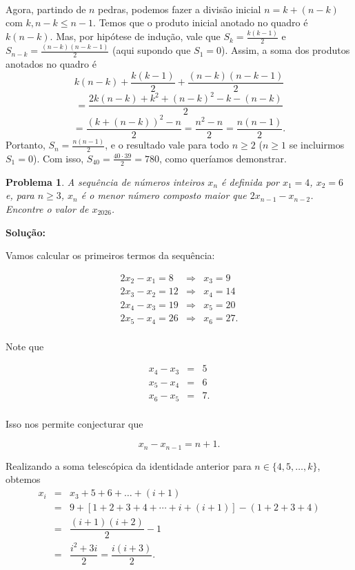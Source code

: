 \documentclass{hipatia}
\newtheorem{problem*}{Problema}
\begin{document}
\ 

Agora, partindo de $n$ pedras, podemos fazer a divisão inicial $n = k + (n - k)$ com $k, n - k \leq n - 1$. Temos que o produto inicial anotado no quadro é $k(n - k)$. Mas, por hipótese de indução, vale que $S_k = \frac{k(k-1)}{2}$ e $S_{n-k} = \frac{(n-k)(n-k-1)}{2}$ (aqui supondo que $S_1 = 0$). Assim, a soma dos produtos anotados no quadro é 
$$k(n - k) + \frac{k(k-1)}{2} + \frac{(n-k)(n-k-1)}{2} $$
$$= \frac{2k(n-k) + k^2 + (n-k)^2 - k - (n-k)}{2}$$ 
$$= \frac{(k + (n-k))^2 - n}{2} = \frac{n^2 - n}{2} = \frac{n(n-1)}{2}.$$ Portanto, $S_n = \frac{n(n-1)}{2}$, e o resultado vale para todo $n \geq 2$ ($n \geq 1$ se incluirmos $S_1 = 0$). Com isso, $S_{40} = \frac{40 \cdot 39}{2} = 780$, como queríamos demonstrar.







\begin{problem*}
A sequência de números inteiros $x_n$ é definida por $x_1 = 4$, $x_2 = 6$ e, para $n \geq 3$, $x_n$ é o menor número composto maior que $2x_{n-1} - x_{n-2}$. Encontre o valor de $x_{2026}$.
\end{problem*}

\noindent \textbf{Solução:}

\noindent Vamos calcular os primeiros termos da sequência:

\begin{eqnarray*}
2x_{2} - x_1 = 8 & \Rightarrow & x_3 = 9 \\
2x_{3} - x_2 = 12 & \Rightarrow & x_4 = 14 \\
2x_{4} - x_3 = 19 & \Rightarrow & x_5 = 20 \\
2x_{5} - x_4 = 26 & \Rightarrow & x_6 = 27 .\\
\end{eqnarray*}

\noindent Note que 

\begin{eqnarray*}
x_4 - x_3 & = & 5 \\
x_5 - x_4 & = & 6 \\
x_6 - x_5 & = & 7 .\\
\end{eqnarray*}

\noindent Isso nos permite conjecturar que 

$$x_{n} - x_{n-1} = n + 1.$$

\noindent Realizando a soma telescópica da identidade anterior para $n \in \{4,5, \ldots, k\}$, obtemos 
\begin{eqnarray*}
x_i & = & x_3+ 5+6+\ldots+(i+1) \\
    & = & 9 + [1 + 2 + 3 + 4 + \cdots + i + (i+1)] - (1 + 2 + 3 + 4)\\
    & = & \dfrac{(i+1)(i+2)}{2} - 1 \\
	& = & \dfrac{i^2 + 3i}{2} = \dfrac{i(i+3)}{2}. 
\end{eqnarray*}
\end{document}

